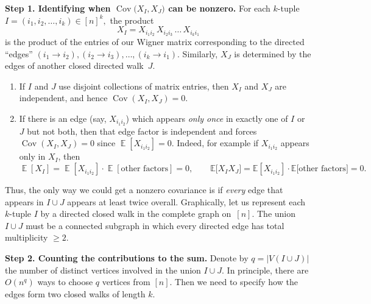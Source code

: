 \documentclass[letterpaper,11pt,oneside,reqno]{article}
\numberwithin{equation}{section}
\theoremstyle{definition}
\begin{document}
\medskip

\noindent
\textbf{Step 1. Identifying when \(\operatorname{\mathrm{Cov}}\bigl(X_I,X_J\bigr)\) can be nonzero.}
For each \(k\)-tuple \(I=(i_1,i_2,\dots,i_k)\in[n]^k,\) the product
\[
	X_I = X_{i_1i_2}\,X_{i_2i_3}\,\dots \,X_{i_k i_1}
\]
is the product of the entries of our Wigner matrix corresponding to the directed ``edges''
\((i_1 \to i_2), (i_2 \to i_3),\dots,(i_k \to i_1)\).
Similarly, \(X_J\) is determined by the edges of another closed directed walk~\(J\).

\begin{enumerate}
\item
If \(I\) and \(J\) use disjoint collections of matrix entries, then \(X_I\) and \(X_J\) are independent, and hence $\operatorname{\mathrm{Cov}}(X_I,X_J)=0$.

\item
	If there is an edge (say, \(X_{i_1 i_2}\)) which appears
	\emph{only once}
	in exactly one of \(I\) or \(J\) but not both, then that
	edge factor is independent and forces
	$\operatorname{\mathrm{Cov}}(X_I,X_J)=0$ since
	$\operatorname{\mathbb{E}}[X_{i_1 i_2}]=0$.
Indeed, for example if \(X_{i_1 i_2}\) appears only in \(X_I\), then
\[
	\operatorname{\mathbb{E}}\left[ X_I \right]
	=
	\operatorname{\mathbb{E}}\left[ X_{i_1 i_2} \right]
	\cdot
	\operatorname{\mathbb{E}}\left[ \text{other factors} \right]
	=0,
	\qquad
	\mathbb{E}\bigl[X_I X_J\bigr]
	=
	\mathbb{E}[X_{i_1 i_2}]
	\cdot
	\mathbb{E}\bigl[\text{other factors}\bigr]
	=0.
\]

\end{enumerate}

\noindent
Thus, the only way we could get a nonzero covariance is if \emph{every} edge that appears in \(I\cup J\) appears at least twice overall.
Graphically, let us represent each \(k\)-tuple \(I\) by a directed closed walk in the complete graph on~\([n]\).  The union \(I\cup J\) must be a connected subgraph in which every directed edge has total multiplicity \(\ge2\).

\medskip

\noindent
\textbf{Step 2. Counting the contributions to the sum.}
Denote by \(q=\lvert V(I\cup J)\rvert\) the number of
distinct vertices involved in the union \(I\cup J\).
In principle, there are $O(n^q)$ ways to choose $q$ vertices from $[n]$.
Then we need to specify how the edges form two closed walks of length $k$.
\end{document}
